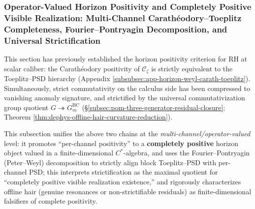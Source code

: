 \subsubsection{Operator-Valued Horizon Positivity and Completely Positive Visible Realization: Multi-Channel Carath\'eodory--Toeplitz Completeness, Fourier--Pontryagin Decomposition, and Universal Strictification}\label{subsubsec:xi-operator-valued-carath-toeplitz-complete-positivity}
This section has previously established the horizon positivity criterion for RH at scalar caliber: the Carath\'eodory positivity of \(\mathscr{C}_{\zeta}\) is strictly equivalent to the Toeplitz--PSD hierarchy (Appendix \ref{subsubsec:app-horizon-weyl-carath-toeplitz}).
Simultaneously, strict commutativity on the calculus side has been compressed to vanishing anomaly signature, and strictified by the universal commutativization group quotient \(G\twoheadrightarrow G^{\mathrm{BC}}_m\) (\S\ref{subsec:pom-three-generator-residual-closure}; Theorem \ref{thm:dephys-offline-hair-curvature-reduction}).
\par
This subsection unifies the above two chains at the \emph{multi-channel/operator-valued} level: it promotes ``per-channel positivity'' to a \textbf{completely positive} horizon object valued in a finite-dimensional \(C^\ast\)-algebra, and uses the Fourier--Pontryagin (Peter--Weyl) decomposition to strictly align block Toeplitz--PSD with per-channel PSD; this interprets strictification as the maximal quotient for ``completely positive visible realization existence,'' and rigorously characterizes offline hair (genuine resonances or non-strictifiable residuals) as finite-dimensional falsifiers of complete positivity.

